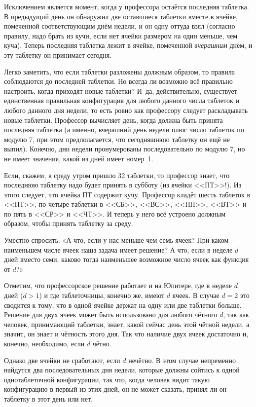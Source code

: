 \documentclass[twoside]{book}
\begin{document}
Исключением является момент, когда у профессора остаётся последняя таблетка.
В предыдущий день он обнаружил две оставшиеся таблетки вместе в ячейке, помеченной соответствующим днём недели, и он одну оттуда взял (согласно правилу, надо брать из кучи, если нет ячейки размером на один меньше, чем куча).
Теперь последняя таблетка лежит в ячейке, помеченной \emph{вчерашним} днём, и эту таблетку он принимает сегодня.

Легко заметить, что если таблетки разложены должным образом, то правила соблюдаются до последней таблетки.
Но всегда ли возможно всё правильно настроить, когда приходят новые таблетки?
И~да, действительно, существует единственная правильная конфигурация для любого данного числа таблеток и любого данного дня недели, то есть ровно как профессору следует раскладывать новые таблетки.
Профессор вычисляет день, когда должна быть принята последняя таблетка (а именно, вчерашний день недели плюс число таблеток по модулю 7, при этом
предполагается, что сегодняшнюю таблетку он ещё не выпил).
Конечно, дни недели пронумерованы последовательно  по модулю 7, но не имеет значения, какой из дней имеет номер~1.

Если, скажем, в среду утром пришло 32 таблетки, то профессор знает, что последнюю таблетку надо будет принять в субботу (из ячейки <<ПТ>>!). Из этого следует, что ячейка ПТ содержит кучу.
Профессор кладёт шесть таблеток в <<ПТ>>, по четыре таблетки в <<СБ>>, <<ВС>>, <<ПН>>, <<ВТ>> и по пять в <<СР>> и <<ЧТ>>.
И теперь у него всё устроено должным образом, чтобы принять таблетку за среду.
\heart

Уместно спросить:
«А что, если у нас меньше чем семь ячеек?
При каком наименьшем числе ячеек наша задача имеет решение?
А что, если в неделе $d$ дней вместо семи,
каково тогда наименьшее возможное число ячеек как функция от $d$?»

Отметим, что профессорское решение работает и на Юпитере, где в неделе $d$ дней ($d>1$) и где таблеточницы, конечно же, имеют $d$ ячеек.
В случае $d=2$ это сводится к тому, что в одной ячейке держат на одну или две таблетки больше.
Решение для двух ячеек может быть использовано для любого чётного $d$, так как человек, принимающий таблетки, знает, какой сейчас день этой чётной недели, а значит, он знает и чётность этого дня.
Так что наличие двух ячеек достаточно и, конечно, необходимо, если $d$ чётно.

Однако две ячейки не сработают, если $d$ нечётно.
В этом случае непременно найдутся два последовательных дня недели, которые должны сойтись к одной однотаблеточной конфигурации, так что, когда человек видит такую конфигурацию в первый из этих дней, он не может сказать, принял ли он таблетку в этот день или нет.
\end{document}
